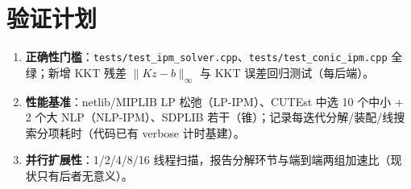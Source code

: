 \documentclass[11pt,a4paper]{ctexart}
\newcommand{\file}[1]{\texttt{#1}}
\begin{document}
\section{验证计划}
\begin{enumerate}[leftmargin=2em]
  \item \textbf{正确性门槛}：\file{tests/test\_ipm\_solver.cpp}、\file{tests/test\_conic\_ipm.cpp} 全绿；新增 KKT 残差 $\|Kz-b\|_\infty$ 与 KKT 误差回归测试（每后端）。
  \item \textbf{性能基准}：netlib/MIPLIB LP 松弛（LP-IPM）、CUTEst 中选 10 个中小 + 2 个大 NLP（NLP-IPM）、SDPLIB 若干（锥）；记录每迭代分解/装配/线搜索分项耗时（代码已有 verbose 计时基建）。
  \item \textbf{并行扩展性}：1/2/4/8/16 线程扫描，报告分解环节与端到端两组加速比（现状只有后者无意义）。
\end{enumerate}
\end{document}
